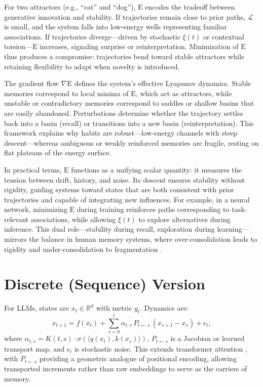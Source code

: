\documentclass[a4paper,12pt]{article}
\newcommand{\E}{\mathrm{E}}
\begin{document}
For two attractors (e.g., ``cat'' and ``dog''), $\E$ encodes the tradeoff between generative innovation and stability. If trajectories remain close to prior paths, $\mathcal{L}$ is small, and the system falls into low-energy wells representing familiar associations. If trajectories diverge—driven by stochastic $\xi(t)$ or contextual torsion—$\E$ increases, signaling surprise or reinterpretation. Minimization of $\E$ thus produces a compromise: trajectories bend toward stable attractors while retaining flexibility to adapt when novelty is introduced.

The gradient flow $\nabla \E$ defines the system’s effective Lyapunov dynamics. Stable memories correspond to local minima of $\E$, which act as attractors, while unstable or contradictory memories correspond to saddles or shallow basins that are easily abandoned. Perturbations determine whether the trajectory settles back into a basin (recall) or transitions into a new basin (reinterpretation). This framework explains why habits are robust—low-energy channels with steep descent—whereas ambiguous or weakly reinforced memories are fragile, resting on flat plateaus of the energy surface.

In practical terms, $\E$ functions as a unifying scalar quantity: it measures the tension between drift, history, and noise. Its descent ensures stability without rigidity, guiding systems toward states that are both consistent with prior trajectories and capable of integrating new influences. For example, in a neural network, minimizing $\E$ during training reinforces paths corresponding to task-relevant associations, while allowing $\xi(t)$ to explore alternatives during inference. This dual role—stability during recall, exploration during learning—mirrors the balance in human memory systems, where over-consolidation leads to rigidity and under-consolidation to fragmentation \citep{squire1992memory}.

\section{Discrete (Sequence) Version}
For LLMs, states are $x_t \in \mathbb{R}^d$ with metric $g_t$. Dynamics are:
\[
x_{t+1} = f(x_t) + \sum_{s=0}^t \alpha_{t,s} \, P_{t \leftarrow s} \, (x_{s+1} - x_s) + \epsilon_t,
\]
where $\alpha_{t,s} = K(t,s) \cdot \sigma(\langle q(x_t), k(x_s) \rangle)$, $P_{t \leftarrow s}$ is a Jacobian or learned transport map, and $\epsilon_t$ is stochastic noise. This extends transformer attention \citep{vaswani2017attention}, with $P_{t \leftarrow s}$ providing a geometric analogue of positional encoding, allowing transported increments rather than raw embeddings to serve as the carriers of memory.
\end{document}
